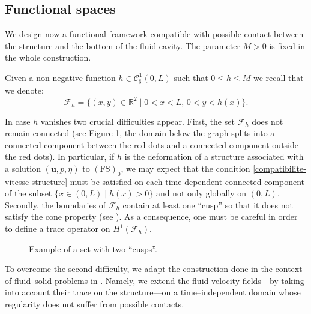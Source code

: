 \documentclass[JEP,XML,SOM,Unicode,NoFloatCountersInSection]{cedram}
\let\mathcal\mathscr
\newcommand{\FS}{\mathrm{FS}}
\theoremstyle{remark}
\theoremstyle{definition}
\newcommand{\ug}{\boldsymbol{u}}
\begin{document}
\subsection{Functional spaces}
We design now a functional framework compatible with possible contact between the structure and the bottom of the fluid cavity. The param\-e\-ter $M > 0$ is fixed in the whole construction.

Given a non-negative function $h \in \mathcal{C}^{1}_{\sharp}(0,L)$ such that $0\leq h \leq M$ we recall that we denote:
\[
\mathcal{F}_{h}=\{(x,y)\in\mathbb{R}^{2}\mid 0<x<L,\,0<y<h(x)\}.
\]

In case $h$ vanishes two crucial difficulties appear.
First, the set $\mathcal{F}_{h}$ does not remain connected (see Figure \ref{fig_cusp}, the domain below the graph splits into a connected component between the red dots and a connected component outside the red dots). In particular, if $h$ is the deformation of a structure associated with a solution $(\ug,p,\eta)$ to
$(\FS)_0$, we may expect that the condition \eqref{compatibilite-vitesse-structure} must be satisfied on each time-dependent connected component of the subset $\{x \in (0, L)\mid h(x) >0\}$ and not only globally on $(0,L)$.
Secondly, the boundaries of $\mathcal{F}_{h}$ contain at least one ``cusp'' so that it does not satisfy the cone property (see \cite{Adams}). As a consequence, one must be careful in order to define a trace operator on $H^{1}(\mathcal F_h)$.

\begin{figure}[!ht]
\centering\smaller
{}
\vspace*{-\baselineskip}
\caption{Example of a set with two ``cusps''. \label{fig_cusp}}
\end{figure}

To overcome the second difficulty, we adapt the construction done in the context of fluid--solid problems in \cite{SanMartin-Starovoitov-Tucsnak}. Namely, we extend the fluid velocity fields---by taking into account their trace on the structure---on a time--independent domain whose regularity does not suffer from possible contacts.
\end{document}
